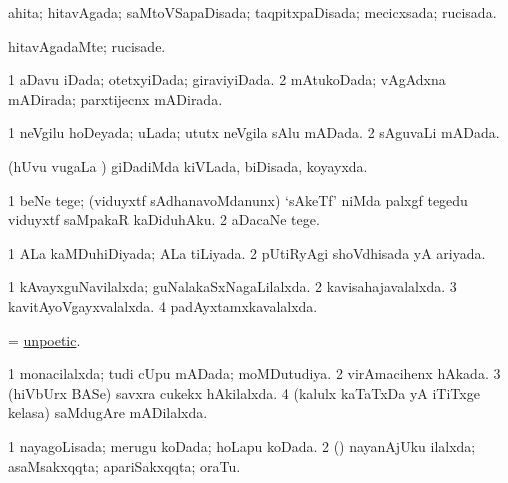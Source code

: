 \bentry
{} 
\gl{\gu}
\expl{}
\bmng
ahita; hitavAgada; saMtoVSapaDisada; taqpitxpaDisada; mecicxsada; rucisada. 
\emng
\eentry

\bentry
{} 
\gl{\kirxvi}
\expl{}
\bmng
hitavAgadaMte; rucisade. 
\emng
\eentry

\bentry
{} 
\gl{\gu}
\expl{}
\bmng
\bnum
\num{1} aDavu iDada; otetxyiDada; giraviyiDada. 
\num{2} mAtukoDada; vAgAdxna mADirada; parxtijecnx mADirada. 
\enum
\emng
\eentry

\bentry
{} 
\gl{\gu}
\expl{}
\bmng
\bnum
\num{1} neVgilu hoDeyada; uLada; ututx neVgila sAlu mADada. 
\num{2} sAguvaLi mADada. 
\enum
\emng
\eentry

\bentry
{} 
\gl{\gu}
\expl{}
\bmng
(hUvu \mo vugaLa \vi) giDadiMda kiVLada, biDisada, koyayxda. 
\emng
\eentry

\bentry
{} 
\gl{\sakirx}
\bmng
\bnum
\num{1} beNe tege; (viduyxtf sAdhanavoMdanunx) `sAkeTf' niMda palxgf tegedu viduyxtf saMpakaR kaDiduhAku. 
\num{2} aDacaNe tege. 
\enum
\emng
\eentry

\bentry
{} 
\gl{\gu}
\expl{}
\bmng
\bnum
\num{1} ALa kaMDuhiDiyada; ALa tiLiyada. 
\num{2} pUtiRyAgi shoVdhisada yA ariyada. 
\enum
\emng
\eentry

\bentry
{} 
\gl{\gu}
\expl{}
\bmng
\bnum
\num{1} kAvayxguNavilalxda; guNalakaSxNagaLilalxda. 
\num{2} kavisahajavalalxda. 
\num{3} kavitAyoVgayxvalalxda. 
\num{4} padAyxtamxkavalalxda. 
\enum
\emng
\eentry

\bentry
{} 
\gl{\gu}
\expl{}
\bmng
= \hyperlink{unpoetic}{unpoetic}. 
\emng
\eentry

\bentry
{} 
\gl{\gu}
\expl{}
\bmng
\bnum
\num{1} monacilalxda; tudi cUpu mADada; moMDutudiya. 
\num{2} virAmacihenx hAkada. 
\num{3} (hiVbUrx BASe) savxra cukekx hAkilalxda. 
\num{4} (kalulx kaTaTxDa yA iTiTxge kelasa) saMdugAre mADilalxda. 
\enum
\emng
\eentry

\bentry 
{} 
\gl{\gu}
\expl{}
\bmng
\bnum
\num{1} nayagoLisada; merugu koDada; hoLapu koDada. 
\num{2} (\rUpa) nayanAjUku ilalxda; asaMsakxqqta; apariSakxqqta; oraTu. 
\enum
\emng
\eentry

